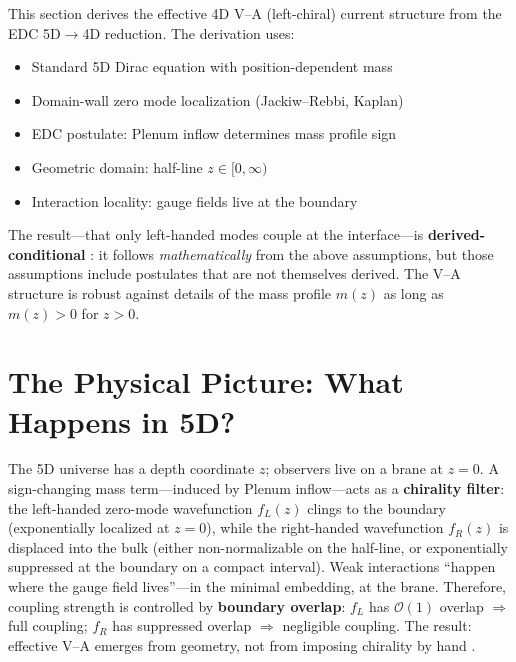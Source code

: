 
\label{sec:ch9_va_structure}

\begin{tcolorbox}[edcGuardrail, title=\textbf{Epistemic Status}]
This section derives the effective 4D V–A (left-chiral) current structure
from the EDC 5D$\to$4D reduction. The derivation uses:
\begin{itemize}[nosep]
    \item Standard 5D Dirac equation with position-dependent mass \tagBL{}
    \item Domain-wall zero mode localization (Jackiw--Rebbi, Kaplan) \tagBL{}
    \item EDC postulate: Plenum inflow determines mass profile sign \tagP{}
    \item Geometric domain: half-line $z \in [0, \infty)$ \tagP{}
    \item Interaction locality: gauge fields live at the boundary \tagP{}
\end{itemize}
The result---that only left-handed modes couple at the interface---is
\textbf{derived-conditional} \tagDc{}: it follows \emph{mathematically} from
the above assumptions, but those assumptions include postulates \tagP{} that
are not themselves derived. The V--A structure is robust against details of
the mass profile $m(z)$ as long as $m(z) > 0$ for $z > 0$.
\end{tcolorbox}

\section{The Physical Picture: What Happens in 5D?}
\label{sec:ch9_physical_picture}

\begin{tcolorbox}[colback=green!5!white, colframe=green!50!black,
    title=\textbf{The V--A Mechanism in One Paragraph}]
The 5D universe has a depth coordinate $z$; observers live on a brane at $z = 0$.
A sign-changing mass term---induced by Plenum inflow---acts as a \textbf{chirality
filter}: the left-handed zero-mode wavefunction $f_L(z)$ clings to the boundary
(exponentially localized at $z = 0$), while the right-handed wavefunction $f_R(z)$
is displaced into the bulk (either non-normalizable on the half-line, or
exponentially suppressed at the boundary on a compact interval). Weak interactions
``happen where the gauge field lives''---in the minimal embedding, at the brane.
Therefore, coupling strength is controlled by \textbf{boundary overlap}: $f_L$ has
$\mathcal{O}(1)$ overlap $\Rightarrow$ full coupling; $f_R$ has suppressed overlap
$\Rightarrow$ negligible coupling. The result: effective V--A emerges from geometry,
not from imposing chirality by hand \tagDc{}.
\end{tcolorbox}

